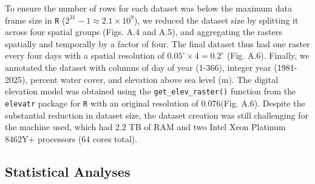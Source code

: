 \documentclass{article}
\begin{document}
To ensure the number of rows for each dataset was below the maximum data frame size in \texttt{R} ($2^{31} - 1 \approx 2.1 \times 10^{9}$), we reduced the dataset size by splitting it across four spatial groups (Figs. A.4 and A.5), and aggregating the rasters spatially and temporally by a factor of four. The final dataset thus had one raster every four days with a spatial resolution of $0.05^\circ\times4=0.2^\circ$ (Fig. A.6). Finally, we annotated the dataset with columns of day of year (1-366), integer year (1981-2025), percent water cover, and elevation above sea level (m). The digital elevation model was obtained using the \texttt{get\_elev\_raster()} function from the \texttt{elevatr} package for \texttt{R} \citep[v. 0.99.0; ][]{hollister_elevatr_2023} with an original resolution of 0.076\textdegree (Fig. A.6). Despite the substantial reduction in dataset size, the dataset creation was still challenging for the machine used, which had 2.2 TB of RAM and two Intel Xeon Platinum 8462Y+ processors (64 cores total).

\subsection{Statistical Analyses} \label{m-analyses}
\end{document}
